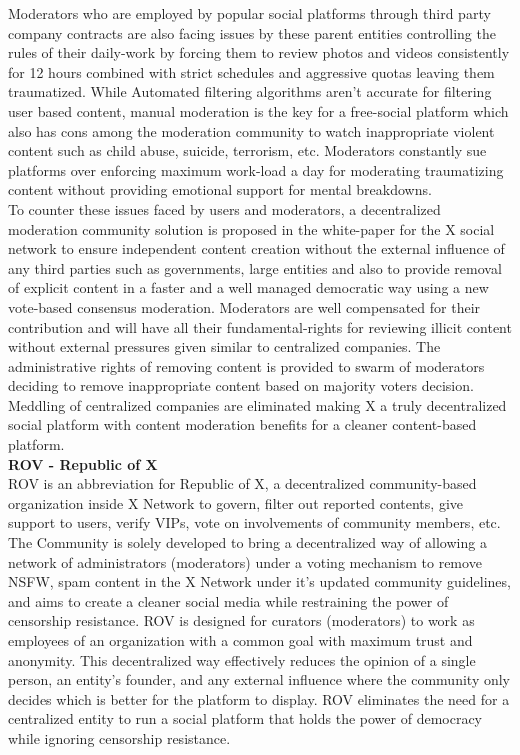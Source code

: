 \documentclass[letterpaper,11pt]{article}
\begin{document}
Moderators who are employed by popular social platforms through third party company contracts are also facing issues by these parent entities controlling the rules of their daily-work by forcing them to review photos and videos consistently for 12 hours combined with strict schedules and aggressive quotas leaving them traumatized. While Automated filtering algorithms aren't accurate for filtering user based content, manual moderation is the key for a free-social platform which also has cons among the moderation community to watch inappropriate violent content such as child abuse, suicide, terrorism, etc. Moderators constantly sue platforms over enforcing maximum work-load a day for moderating traumatizing content without providing emotional support for mental breakdowns.\\

To counter these issues faced by users and moderators, a decentralized moderation community solution is proposed in the white-paper for the X social network to ensure independent content creation without the external influence of any third parties such as governments, large entities and also to provide removal of explicit content in a faster and a well managed democratic way using a new vote-based consensus moderation. Moderators are well compensated for their contribution and will have all their fundamental-rights for reviewing illicit content without external pressures given similar to centralized companies. The administrative rights of removing content is provided to swarm of moderators deciding to remove inappropriate content based on majority voters decision. Meddling of centralized companies are eliminated making X a truly decentralized social platform with content moderation benefits for a cleaner content-based platform.\\

\textbf{ROV - Republic of X}\\

ROV is an abbreviation for Republic of X, a decentralized community-based organization inside X Network to govern, filter out reported contents, give support to users, verify VIPs, vote on involvements of community members, etc. The Community is solely developed to bring a decentralized way of allowing a network of administrators (moderators) under a voting mechanism to remove NSFW, spam content in the X Network under it's updated community guidelines, and aims to create a cleaner social media while restraining the power of censorship resistance. ROV is designed for curators (moderators) to work as employees of an organization with a common goal with maximum trust and anonymity. This decentralized way effectively reduces the opinion of a single person, an entity’s founder, and any external influence where the community only decides which is better for the platform to display. ROV eliminates the need for a centralized entity to run a social platform that holds the power of democracy while ignoring censorship resistance. \\
\end{document}
